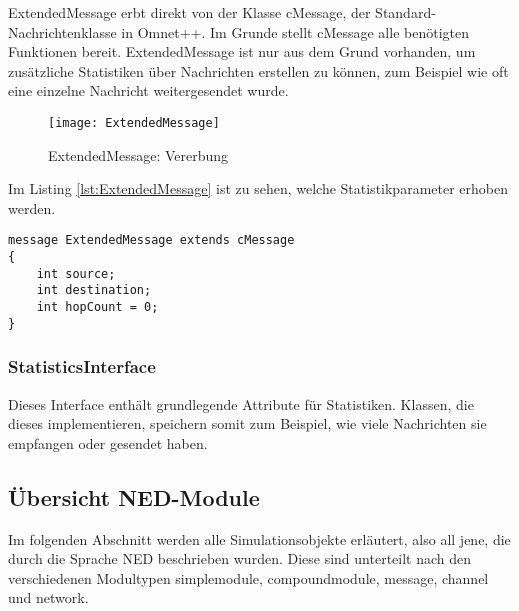 ExtendedMessage erbt direkt von der Klasse cMessage, der Standard-Nachrichtenklasse in Omnet++. Im Grunde stellt cMessage alle benötigten Funktionen bereit. ExtendedMessage ist nur aus dem Grund vorhanden, um zusätzliche Statistiken über Nachrichten erstellen zu können, zum Beispiel wie oft eine einzelne Nachricht weitergesendet wurde.

\begin{figure}[htbp]
\centering
\caption{ExtendedMessage: Vererbung}
\texttt{[image: ExtendedMessage]}
\end{figure}

Im Listing \ref{lst:ExtendedMessage} ist zu sehen, welche Statistikparameter erhoben werden.

\begin{minipage}{\textwidth}
\begin{lstlisting}[language=NED, label=lst:ExtendedMessage, caption=ExtendedMessage]
message ExtendedMessage extends cMessage
{
    int source;
    int destination;
    int hopCount = 0;    
}
\end{lstlisting}
\end{minipage}

\subsubsection{StatisticsInterface}

Dieses Interface enthält grundlegende Attribute für Statistiken. Klassen, die dieses implementieren, speichern somit zum Beispiel, wie viele Nachrichten sie empfangen oder gesendet haben. 

\subsection{Übersicht NED-Module}

Im folgenden Abschnitt werden alle Simulationsobjekte erläutert, also all jene, die durch die Sprache NED beschrieben wurden. Diese sind unterteilt nach den verschiedenen Modultypen simplemodule, compoundmodule, message, channel und network.

